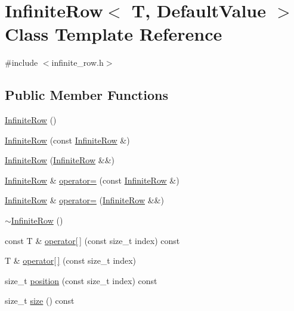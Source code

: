 \hypertarget{classInfiniteRow}{}\section{Infinite\+Row$<$ T, Default\+Value $>$ Class Template Reference}
\label{classInfiniteRow}


{\ttfamily \#include $<$infinite\+\_\+row.\+h$>$}

\subsection*{Public Member Functions}
\begin{DoxyCompactItemize}
\item 
\hyperlink{classInfiniteRow_ab5d574f96b18c889ce001aa54c7fc56f}{Infinite\+Row} ()
\item 
\hyperlink{classInfiniteRow_a818cfcb6cc36911994e51d1846bf0cb2}{Infinite\+Row} (const \hyperlink{classInfiniteRow}{Infinite\+Row} \&)
\item 
\hyperlink{classInfiniteRow_a4bbdbd72cb0f40ebf2ee2623bcf8b0ce}{Infinite\+Row} (\hyperlink{classInfiniteRow}{Infinite\+Row} \&\&)
\item 
\hyperlink{classInfiniteRow}{Infinite\+Row} \& \hyperlink{classInfiniteRow_a35e69c0b6ac47567481bcbf3f4b1d67e}{operator=} (const \hyperlink{classInfiniteRow}{Infinite\+Row} \&)
\item 
\hyperlink{classInfiniteRow}{Infinite\+Row} \& \hyperlink{classInfiniteRow_a312ede3dbebfcbf41f9e89d1d04fc93b}{operator=} (\hyperlink{classInfiniteRow}{Infinite\+Row} \&\&)
\item 
\hyperlink{classInfiniteRow_a35b43c388e4f3e980fbf823fbca37b36}{$\sim$\+Infinite\+Row} ()
\item 
const T \& \hyperlink{classInfiniteRow_a844d457062f71634f3263dabc6aca9c6}{operator\mbox{[}$\,$\mbox{]}} (const size\+\_\+t index) const 
\item 
T \& \hyperlink{classInfiniteRow_a85338dd41cd9ec65ebd85b23556a80fd}{operator\mbox{[}$\,$\mbox{]}} (const size\+\_\+t index)
\item 
size\+\_\+t \hyperlink{classInfiniteRow_a2cf600f89c92e9163093ac2cd5ae75cc}{position} (const size\+\_\+t index) const 
\item 
size\+\_\+t \hyperlink{classInfiniteRow_a76e52c26ba4b10c0ff7852e6c449a51b}{size} () const 
\end{DoxyCompactItemize}


